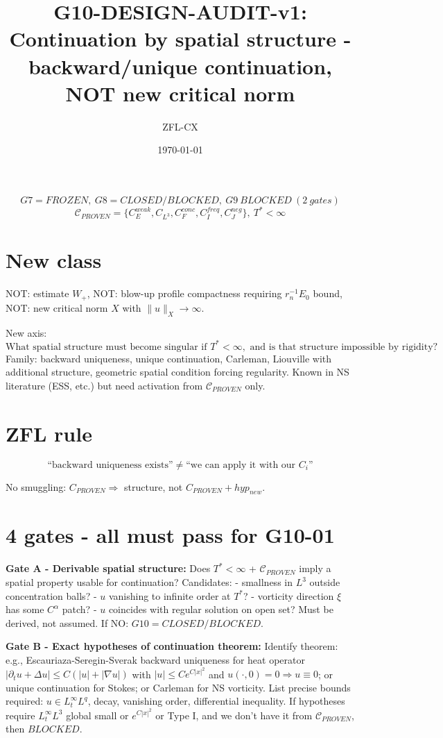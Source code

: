 \documentclass[11pt]{article}
\begin{document}
\title{G10-DESIGN-AUDIT-v1: Continuation by spatial structure - backward/unique continuation, NOT new critical norm}
\author{ZFL-CX}\date{\today}\maketitle

\[
\boxed{G7=FROZEN,\ G8=CLOSED/BLOCKED,\ G9\ BLOCKED\ (2\ gates)}
\]
\[
\boxed{\mathcal C_{PROVEN}=\{C_E^{weak},C_{L^3},C_F^{conc},C_I^{freq},C_J^{neg}\},\ T^*<\infty}
\]

\section{New class}
NOT: estimate $W_+$, NOT: blow-up profile compactness requiring $r_n^{-1}E_0$ bound, NOT: new critical norm $X$ with $\|u\|_X\to\infty$.

New axis:
\[
\boxed{\text{What spatial structure must become singular if }T^*<\infty,\text{ and is that structure impossible by rigidity?}}
\]
Family: backward uniqueness, unique continuation, Carleman, Liouville with additional structure, geometric spatial condition forcing regularity. Known in NS literature (ESS, etc.) but need activation from $\mathcal C_{PROVEN}$ only.

\section{ZFL rule}
\[
\boxed{\text{``backward uniqueness exists''}\neq\text{``we can apply it with our }C_i\text{''}}
\]

No smuggling: $C_{PROVEN}\Rightarrow$ structure, not $C_{PROVEN}+hyp_{new}$.

\section{4 gates - all must pass for G10-01}

\textbf{Gate A - Derivable spatial structure:}
Does $T^*<\infty$ + $\mathcal C_{PROVEN}$ imply a spatial property usable for continuation?
Candidates:
- smallness in $L^3$ outside concentration balls?
- $u$ vanishing to infinite order at $T^*$?
- vorticity direction $\xi$ has some $C^\alpha$ patch?
- $u$ coincides with regular solution on open set?
Must be derived, not assumed. If NO: $\boxed{G10=CLOSED/BLOCKED}$.

\textbf{Gate B - Exact hypotheses of continuation theorem:}
Identify theorem: e.g., Escauriaza-Seregin-Sverak backward uniqueness for heat operator $|\partial_t u+\Delta u|\le C(|u|+|\nabla u|)$ with $|u|\le Ce^{C|x|^2}$ and $u(\cdot,0)=0\Rightarrow u\equiv0$; or unique continuation for Stokes; or Carleman for NS vorticity.
List precise bounds required: $u\in L^\infty_tL^q$, decay, vanishing order, differential inequality. If hypotheses require $L^\infty_tL^3$ global small or $e^{C|x|^2}$ or Type I, and we don't have it from $\mathcal C_{PROVEN}$, then $\boxed{BLOCKED}$.
\end{document}
